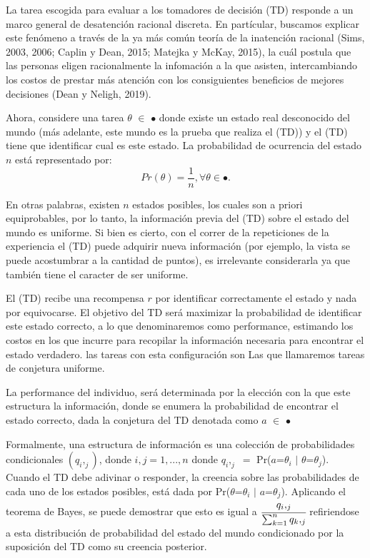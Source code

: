 \documentclass[11pt,letterpaper]{article}
\begin{document}
La tarea escogida para evaluar a los tomadores de decisión (TD) responde a un marco general de desatención racional discreta. En partícular, buscamos explicar este fenómeno a través de la ya más común teoría de la inatención racional (Sims, 2003, 2006; Caplin y Dean, 2015; Matejka y McKay, 2015), la cuál postula que las personas eligen racionalmente la infomación a la que asisten, intercambiando los costos de prestar más atención con los consiguientes beneficios de mejores decisiones (Dean y Neligh, 2019).

Ahora, considere una tarea $\theta$ $\in$ $\bullet$ donde existe un estado real desconocido del mundo (más adelante, este mundo es la prueba que realiza el (TD)) y el (TD) tiene que identificar cual es este estado. La probabilidad de ocurrencia del estado $n$ está representado por: 
$${Pr}(\theta) = \frac{1}{n}, \forall\theta\in\bullet.$$


En otras palabras, existen $n$ estados posibles, los cuales son a priori equiprobables, por lo tanto, la información previa del (TD) sobre el estado del mundo es uniforme. Si bien es cierto, con el correr de la repeticiones de la experiencia el (TD) puede adquirir nueva información (por ejemplo, la vista se puede acostumbrar a la cantidad de puntos), es irrelevante considerarla ya que también tiene el caracter de ser uniforme.

El (TD) recibe una recompensa $r$ por identificar correctamente el estado y nada por equivocarse. El objetivo del TD será maximizar la probabilidad de identificar este estado correcto, a lo que denominaremos como performance, estimando los costos en los que incurre para recopilar la información necesaria para encontrar el estado verdadero. las tareas con esta configuración son Las que llamaremos tareas de conjetura uniforme.

La performance del individuo, será determinada por la elección con la que este estructura la información, donde se enumera la probabilidad de encontrar el estado correcto, dada la conjetura del TD denotada como $a$ $\in$ $\bullet$

Formalmente, una estructura de información es una colección de probabilidades condicionales $(q_i,_j)$, donde $i,j=1,...,n$ donde $q_i,_j$ $=$ Pr($a$=$\theta_i$ $|$ $\theta$=$\theta_j$). Cuando el TD debe adivinar o responder, la creencia sobre las probabilidades de cada uno de los estados posibles, está dada por Pr($\theta$=$\theta_i$ $|$ $a$=$\theta_j$). Aplicando el teorema de Bayes, se puede demostrar que esto es igual a $\cfrac{q_i,_j}{\sum_{k=1}^{n}q_k,_j}$ refiriendose a esta distribución de probabilidad del estado del mundo condicionado por la suposición del TD como su creencia posterior.
\end{document}
